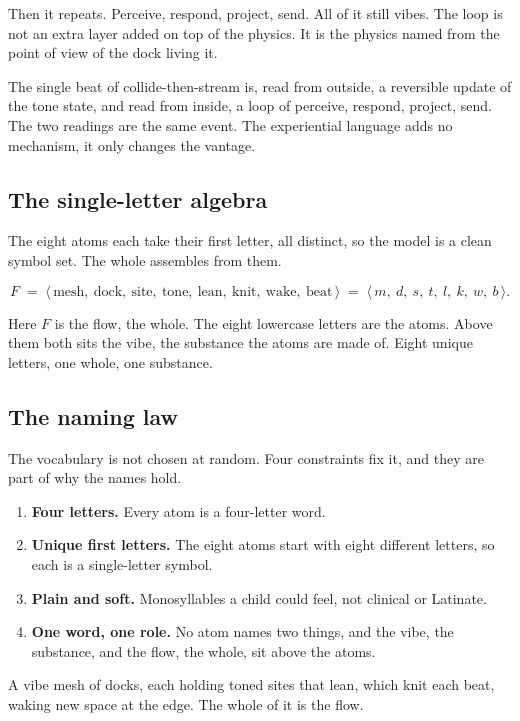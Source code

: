 Then it repeats. Perceive, respond, project, send. All of it still vibes. The loop is not an extra layer added on top of the physics. It is the physics named from the point of view of the dock living it.

\begin{result}
The single beat of collide-then-stream is, read from outside, a reversible update of the tone state, and read from inside, a loop of perceive, respond, project, send. The two readings are the same event. The experiential language adds no mechanism, it only changes the vantage.
\end{result}

\subsection{The single-letter algebra}

The eight atoms each take their first letter, all distinct, so the model is a clean symbol set. The whole assembles from them.

\[
F \;=\; \langle\, \mathrm{mesh},\ \mathrm{dock},\ \mathrm{site},\ \mathrm{tone},\ \mathrm{lean},\ \mathrm{knit},\ \mathrm{wake},\ \mathrm{beat} \,\rangle
\;=\; \langle\, m,\ d,\ s,\ t,\ l,\ k,\ w,\ b \,\rangle .
\]

Here $F$ is the flow, the whole. The eight lowercase letters are the atoms. Above them both sits the vibe, the substance the atoms are made of. Eight unique letters, one whole, one substance.

\subsection{The naming law}

The vocabulary is not chosen at random. Four constraints fix it, and they are part of why the names hold.

\begin{enumerate}
\item \textbf{Four letters.} Every atom is a four-letter word.
\item \textbf{Unique first letters.} The eight atoms start with eight different letters, so each is a single-letter symbol.
\item \textbf{Plain and soft.} Monosyllables a child could feel, not clinical or Latinate.
\item \textbf{One word, one role.} No atom names two things, and the vibe, the substance, and the flow, the whole, sit above the atoms.
\end{enumerate}

\begin{principle}
A vibe mesh of docks, each holding toned sites that lean, which knit each beat, waking new space at the edge. The whole of it is the flow.
\end{principle}
